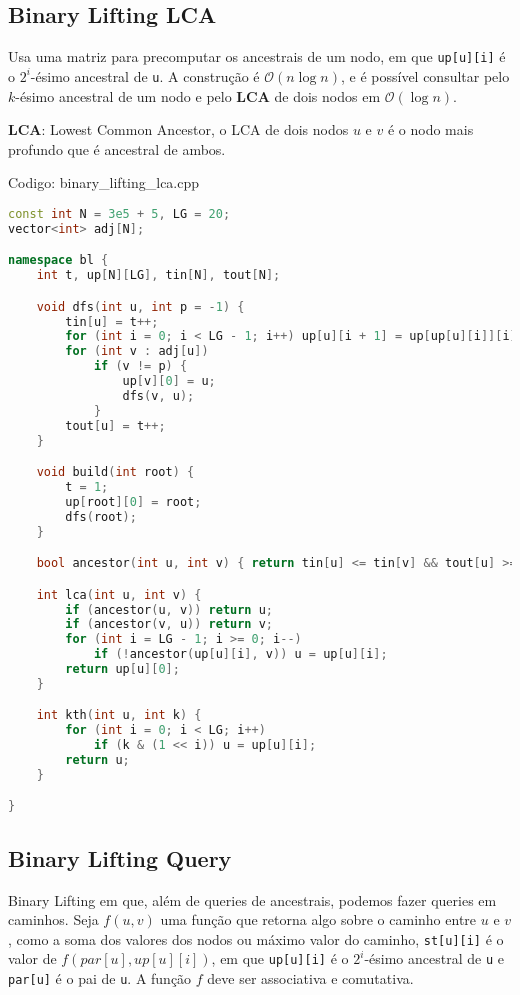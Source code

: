 \documentclass[10pt, a4paper, oneside]{book}
\begin{document}
\subsection{Binary Lifting LCA}


Usa uma matriz para precomputar os ancestrais de um nodo, em que \texttt{up[u][i]} é o $2 ^ i$-ésimo ancestral de \texttt{u}. A construção é $\mathcal{O}(n \log n)$, e é possível consultar pelo $k$-ésimo ancestral de um nodo e pelo \textbf{LCA} de dois nodos em $\mathcal{O}(\log n)$.



\textbf{LCA}: Lowest Common Ancestor, o LCA de dois nodos $u$ e $v$ é o nodo mais profundo que é ancestral de ambos.

\hfill

Codigo: binary\_lifting\_lca.cpp

\begin{lstlisting}[language=C++]
const int N = 3e5 + 5, LG = 20;
vector<int> adj[N];

namespace bl {
    int t, up[N][LG], tin[N], tout[N];

    void dfs(int u, int p = -1) {
        tin[u] = t++;
        for (int i = 0; i < LG - 1; i++) up[u][i + 1] = up[up[u][i]][i];
        for (int v : adj[u])
            if (v != p) {
                up[v][0] = u;
                dfs(v, u);
            }
        tout[u] = t++;
    }

    void build(int root) {
        t = 1;
        up[root][0] = root;
        dfs(root);
    }

    bool ancestor(int u, int v) { return tin[u] <= tin[v] && tout[u] >= tout[v]; }

    int lca(int u, int v) {
        if (ancestor(u, v)) return u;
        if (ancestor(v, u)) return v;
        for (int i = LG - 1; i >= 0; i--)
            if (!ancestor(up[u][i], v)) u = up[u][i];
        return up[u][0];
    }

    int kth(int u, int k) {
        for (int i = 0; i < LG; i++)
            if (k & (1 << i)) u = up[u][i];
        return u;
    }

}
\end{lstlisting}
\hfill

\subsection{Binary Lifting Query}


Binary Lifting em que, além de queries de ancestrais, podemos fazer queries em caminhos. Seja $f(u, v)$ uma função que retorna algo sobre o caminho entre $u$ e $v$, como a soma dos valores dos nodos ou máximo valor do caminho, \texttt{st[u][i]} é o valor de $f(par[u], up[u][i])$, em que \texttt{up[u][i]} é o $2 ^ i$-ésimo ancestral de \texttt{u} e \texttt{par[u]} é o pai de \texttt{u}. A função $f$ deve ser associativa e comutativa.
\end{document}
